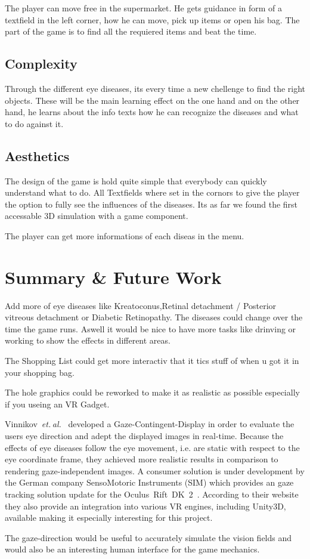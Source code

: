 \documentclass{acm_proc_article-sp}
\newcommand{\etal}{\textit{et. al.}}
\begin{document}
The player can move free in the supermarket. He gets guidance in form of a textfield in the left corner, how he can move, pick up items or open his bag. The part of the game is to find all the requiered items and beat the time.

\subsection{Complexity}

Through the different eye diseases, its every time a new chellenge to find the right objects. These will be the main learning effect on the one hand and on the other hand, he learns about the info texts how he can recognize the diseases and what to do against it.

\subsection{Aesthetics}

The design of the game is hold quite simple that everybody can quickly understand what to do. All Textfields where set in the cornors to give the player the option to fully see the influences of the diseases. Its as far we found the first accessable 3D simulation with a game component.

The player can get more informations of each diseas in the menu.

%
%
\section{Summary \& Future Work}

Add more of eye diseases like Kreatoconus,Retinal detachment / Posterior vitreous detachment or Diabetic Retinopathy. The diseases could change over the time the game runs. Aswell it would be nice to have more tasks like drinving or working to show the effects in different areas.

The Shopping List could get more interactiv that it tics stuff of when u got it in your shopping bag.

The hole graphics could be reworked to make it as realistic as possible especially if you useing an VR Gadget.

Vinnikov \etal \cite{gazedisplays} developed a Gaze-Contingent-Display in order to evaluate the users eye direction and adept the displayed images in real-time.
Because the effects of eye diseases follow the eye movement, i.e. are static with respect to the eye coordinate frame, they achieved more realistic results in comparison to rendering gaze-independent images.
A consumer solution is under development by the German company SensoMotoric Instruments (SIM) which provides an gaze tracking solution update for the Oculus Rift DK 2 \cite{smi-oculus, arstechoculus}.
According to their website they also provide an integration into various VR engines, including Unity3D, available making it especially interesting for this project.

The gaze-direction would be useful to accurately simulate the vision fields and would also be an interesting human interface for the game mechanics.
%
\printbibliography

\balancecolumns
\end{document}
